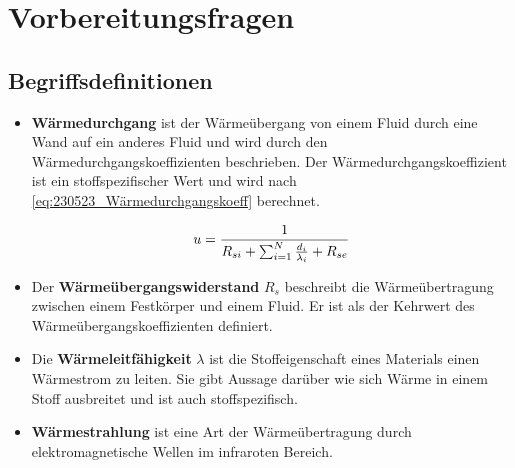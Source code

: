 \section{Vorbereitungsfragen}
\subsection{Begriffsdefinitionen}

\begin{itemize}
\item \textbf{Wärmedurchgang} ist der Wärmeübergang von einem Fluid durch eine Wand auf ein anderes Fluid und wird durch den Wärmedurchgangskoeffizienten beschrieben. Der Wärmedurchgangskoeffizient ist ein stoffspezifischer Wert und wird nach \autoref{eq:230523_Wärmedurchgangskoeff} berechnet. 
 
\begin{equation}
	\centering
	u=\frac{1}{R_{si}+\sum_{i=1}^N \frac{d_i}{\lambda_i}+R_{se}}
	\label{eq:230523_Wärmedurchgangskoeff}
\end{equation}

\item Der \textbf{Wärmeübergangswiderstand} $R_s$ beschreibt die Wärmeübertragung zwischen einem Festkörper und einem Fluid. Er ist als der Kehrwert des Wärmeübergangskoeffizienten definiert.

\item Die \textbf{Wärmeleitfähigkeit} $\lambda$ ist die Stoffeigenschaft eines Materials einen Wärmestrom zu leiten. Sie gibt Aussage darüber wie sich Wärme in einem Stoff ausbreitet und ist auch stoffspezifisch.

\item \textbf{Wärmestrahlung} ist eine Art der Wärmeübertragung durch elektromagnetische Wellen im infraroten Bereich.

\end{itemize}




